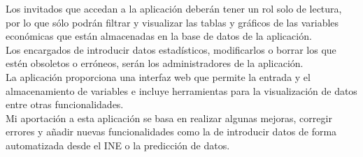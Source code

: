 Los invitados que accedan a la aplicación deberán tener un rol solo de lectura, por lo que sólo podrán filtrar y visualizar las tablas y gráficos de las variables económicas que están almacenadas en la base de datos de la aplicación.\\
Los encargados de introducir datos estadísticos, modificarlos o borrar los que estén obsoletos o erróneos, serán los administradores de la aplicación.\\
La aplicación proporciona una interfaz web que permite la entrada y el almacenamiento de variables e incluye herramientas para la visualización de datos entre otras funcionalidades.\\
Mi aportación a esta aplicación se basa en realizar algunas mejoras, corregir errores y añadir nuevas funcionalidades como la de introducir datos de forma automatizada desde el INE o la predicción de datos.\\


